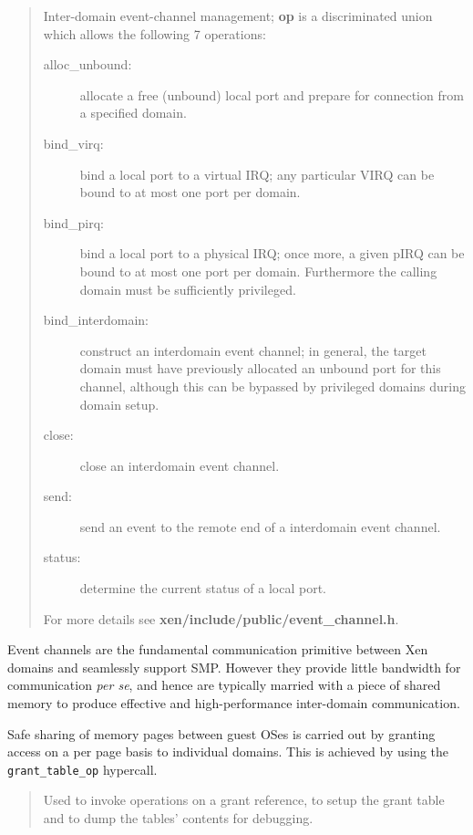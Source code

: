 \documentclass[11pt,twoside,final,openright]{report}
\newcommand{\hypercall}[1]{\vspace{2mm}{\sf #1}}
\begin{document}
\begin{quote}
\hypercall{event\_channel\_op(evtchn\_op\_t *op)} 

Inter-domain event-channel management; {\bf op} is a discriminated 
union which allows the following 7 operations: 

\begin{description} 

\item[alloc\_unbound:] allocate a free (unbound) local
  port and prepare for connection from a specified domain. 
\item[bind\_virq:] bind a local port to a virtual 
IRQ; any particular VIRQ can be bound to at most one port per domain. 
\item[bind\_pirq:] bind a local port to a physical IRQ;
once more, a given pIRQ can be bound to at most one port per
domain. Furthermore the calling domain must be sufficiently
privileged.
\item[bind\_interdomain:] construct an interdomain event 
channel; in general, the target domain must have previously allocated 
an unbound port for this channel, although this can be bypassed by 
privileged domains during domain setup. 
\item[close:] close an interdomain event channel. 
\item[send:] send an event to the remote end of a 
interdomain event channel. 
\item[status:] determine the current status of a local port. 
\end{description} 

For more details see
{\bf xen/include/public/event\_channel.h}. 

\end{quote} 

Event channels are the fundamental communication primitive between 
Xen domains and seamlessly support SMP. However they provide little
bandwidth for communication {\sl per se}, and hence are typically 
married with a piece of shared memory to produce effective and 
high-performance inter-domain communication. 

Safe sharing of memory pages between guest OSes is carried out by
granting access on a per page basis to individual domains. This is
achieved by using the {\tt grant\_table\_op} hypercall.

\begin{quote}
\hypercall{grant\_table\_op(unsigned int cmd, void *uop, unsigned int count)}

Used to invoke operations on a grant reference, to setup the grant
table and to dump the tables' contents for debugging.

\end{quote} 
\end{document}
